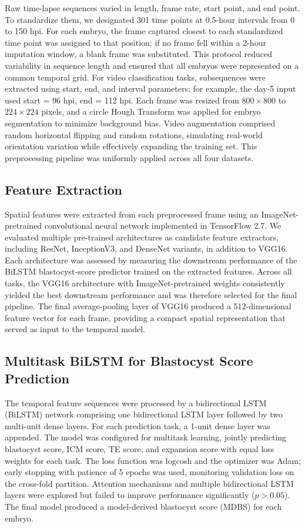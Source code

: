 \documentclass[11pt]{article}
\begin{document}
Raw time-lapse sequences varied in length, frame rate, start point, and end point. To standardize them, we designated 301 time points at 0.5-hour intervals from 0 to 150 hpi. For each embryo, the frame captured closest to each standardized time point was assigned to that position; if no frame fell within a 2-hour imputation window, a blank frame was substituted. This protocol reduced variability in sequence length and ensured that all embryos were represented on a common temporal grid. For video classification tasks, subsequences were extracted using start, end, and interval parameters; for example, the day-5 input used start = 96 hpi, end = 112 hpi. Each frame was resized from $800 \times 800$ to $224 \times 224$ pixels, and a circle Hough Transform was applied for embryo segmentation to minimize background bias. Video augmentation comprised random horizontal flipping and random rotations, simulating real-world orientation variation while effectively expanding the training set. This preprocessing pipeline was uniformly applied across all four datasets.

\subsection{Feature Extraction}

Spatial features were extracted from each preprocessed frame using an ImageNet-pretrained convolutional neural network implemented in TensorFlow 2.7. We evaluated multiple pre-trained architectures as candidate feature extractors, including ResNet, InceptionV3, and DenseNet variants, in addition to VGG16. Each architecture was assessed by measuring the downstream performance of the BiLSTM blastocyst-score predictor trained on the extracted features. Across all tasks, the VGG16 architecture with ImageNet-pretrained weights consistently yielded the best downstream performance and was therefore selected for the final pipeline. The final average-pooling layer of VGG16 produced a 512-dimensional feature vector for each frame, providing a compact spatial representation that served as input to the temporal model.

\subsection{Multitask BiLSTM for Blastocyst Score Prediction}

The temporal feature sequences were processed by a bidirectional LSTM (BiLSTM) network comprising one bidirectional LSTM layer followed by two multi-unit dense layers. For each prediction task, a 1-unit dense layer was appended. The model was configured for multitask learning, jointly predicting blastocyst score, ICM score, TE score, and expansion score with equal loss weights for each task. The loss function was logcosh and the optimizer was Adam; early stopping with patience of 5 epochs was used, monitoring validation loss on the cross-fold partition. Attention mechanisms and multiple bidirectional LSTM layers were explored but failed to improve performance significantly ($p > 0.05$). The final model produced a model-derived blastocyst score (MDBS) for each embryo.
\end{document}
